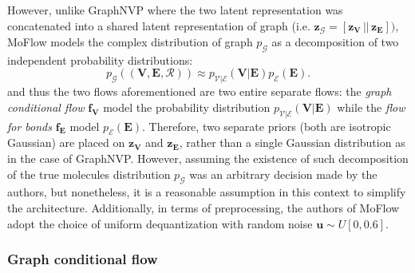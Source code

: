 However, unlike GraphNVP where the two latent representation was concatenated
into a shared latent representation of graph (i.e. $\mathbf{z}_{\mathcal{G}} =
[\mathbf{z}_{\mathbf{V}} \, || \, \mathbf{z}_{\mathbf{E}}])$, MoFlow models the
complex distribution of graph $p_{\mathcal{G}}$ as a decomposition of two
independent probability distributions: $$ p_{\mathcal{G}}((\mathbf{V},
\mathbf{E}, \mathcal{R})) \approx p_{\mathcal{V|E}}(\mathbf{V|E})
p_{\mathcal{E}}(\mathbf{E}) .$$ and thus the two flows aforementioned are two
entire separate flows: the \textit{graph conditional flow}
$\mathbf{f}_{\mathbf{V}}$ model the probability distribution $p_{\mathcal{V} |
\mathcal{E}}(\mathbf{V | E})$ while the \textit{flow for bonds} $\mathbf{f_{E}}$
model $p_{\mathcal{E}}(\mathbf{E})$. Therefore, two separate priors (both are
isotropic Gaussian) are placed on $\mathbf{z}_{\mathbf{V}}$ and
$\mathbf{z}_{\mathbf{E}}$, rather than a single Gaussian distribution as in the
case of GraphNVP. However, assuming the existence of such decomposition of the
true molecules distribution $p_{\mathcal{G}}$ was an arbitrary decision made by
the authors, but nonetheless, it is a reasonable assumption in this context to
simplify the architecture. Additionally, in terms of preprocessing, the authors
of MoFlow adopt the choice of uniform dequantization with random noise
$\mathbf{u} \sim U[0,0.6]$.

\subsubsection{Graph conditional flow}

